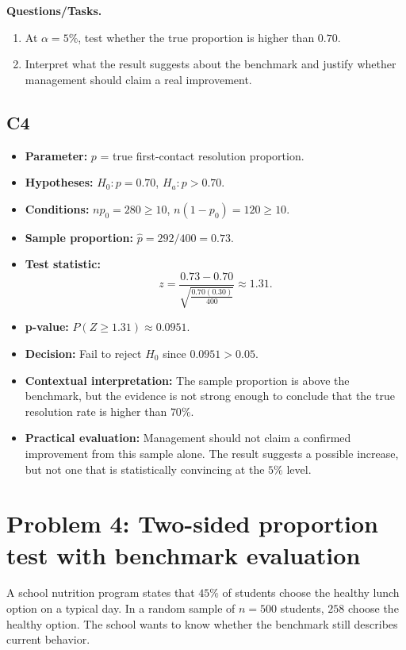 	\textbf{Questions/Tasks.}
	\begin{enumerate}
		\item[(a)] At \(\alpha=5\%\), test whether the true proportion is higher than \(0.70\).
		\item[(b)] Interpret what the result suggests about the benchmark and justify whether management should claim a real improvement.
	\end{enumerate}
	
	\subsection*{C4}
	\begin{itemize}
		\item \textbf{Parameter:} \(p\) = true first-contact resolution proportion.
		\item \textbf{Hypotheses:} \(H_0:p=0.70\), \(H_a:p>0.70\).
		\item \textbf{Conditions:} \(np_0=280\ge10\), \(n(1-p_0)=120\ge10\).
		\item \textbf{Sample proportion:} \(\hat p=292/400=0.73\).
		\item \textbf{Test statistic:}
		\[
		z=\frac{0.73-0.70}{\sqrt{\frac{0.70(0.30)}{400}}}\approx1.31.
		\]
		\item \textbf{p-value:} \(P(Z\ge1.31)\approx0.0951\).
		\item \textbf{Decision:} Fail to reject \(H_0\) since \(0.0951>0.05\).
		\item \textbf{Contextual interpretation:} The sample proportion is above the benchmark, but the evidence is not strong enough to conclude that the true resolution rate is higher than \(70\%\).
		\item \textbf{Practical evaluation:} Management should not claim a confirmed improvement from this sample alone. The result suggests a possible increase, but not one that is statistically convincing at the \(5\%\) level.
	\end{itemize}
	
	\begin{center}
	\end{center}
	
	\section{Problem 4: Two-sided proportion test with benchmark evaluation}
	A school nutrition program states that \(45\%\) of students choose the healthy lunch option on a typical day. In a random sample of \(n=500\) students, \(258\) choose the healthy option. The school wants to know whether the benchmark still describes current behavior.
	
